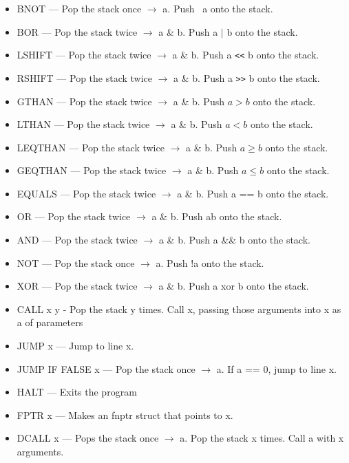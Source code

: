 \documentclass[12pt, letterpaper, oneside]{article}
\begin{document}
\begin{itemize}
		\item BNOT --- Pop the stack once $\rightarrow$ a. Push ~a onto the stack.
		\item BOR --- Pop the stack twice $\rightarrow$ a \& b. Push a $\vert$ b onto the stack.
		\item LSHIFT --- Pop the stack twice $\rightarrow$ a \& b. Push a \verb|<<|  b onto the stack.
		\item RSHIFT --- Pop the stack twice $\rightarrow$ a \& b. Push a \verb|>>| b onto the stack.
		\item GTHAN --- Pop the stack twice $\rightarrow$ a \& b. Push $a>b$ onto the stack.
		\item LTHAN --- Pop the stack twice $\rightarrow$ a \& b. Push $a<b$ onto the stack.
		\item LEQTHAN --- Pop the stack twice $\rightarrow$ a \& b. Push $a\geq b$ onto the stack.
		\item GEQTHAN --- Pop the stack twice $\rightarrow$ a \& b. Push $a\leq b$ onto the stack.
		\item EQUALS --- Pop the stack twice $\rightarrow$ a \& b. Push a == b onto the stack.
		\item OR --- Pop the stack twice $\rightarrow$ a \& b. Push a\textbar\textbar b onto the stack.
		\item AND --- Pop the stack twice $\rightarrow$ a \& b. Push a \&\& b onto the stack.
		\item NOT --- Pop the stack once $\rightarrow$ a. Push !a onto the stack.
		\item XOR --- Pop the stack twice $\rightarrow$ a \& b. Push a xor b onto the stack.
		\item CALL x y - Pop the stack y times. Call x, passing those arguments into x as a of parameters
		\item JUMP x --- Jump to line x.
		\item JUMP IF FALSE x --- Pop the stack once $\rightarrow$ a. If a == 0, jump to line x.
		\item HALT --- Exits the program
		\item FPTR x --- Makes an fnptr struct that points to x.
		\item DCALL x --- Pops the stack once $\rightarrow$ a. Pop the stack x times. Call a with x arguments.
	\end{itemize}
	\newpage
	\renewcommand{\thepage}{}
\end{document}
